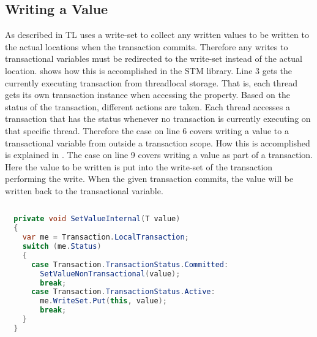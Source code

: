 \subsection{Writing a Value}
\label{sec:stm_imple_internal_detials_write}
As described in  TL uses a write-set to collect any written values to be written to the actual locations when the transaction commits. Therefore any writes to transactional variables must be redirected to the write-set instead of the actual location.  shows how this is accomplished in the \ac{STM} library. Line 3 gets the currently executing transaction from threadlocal storage. That is, each thread gets its own transaction instance when accessing the  property. Based on the status of the transaction, different actions are taken. Each thread accesses a transaction that has the status  whenever no transaction is currently executing on that specific thread. Therefore the case on line 6 covers writing a value to a transactional variable from outside a transaction scope. How this is accomplished is explained in . The case on line 9 covers writing a value as part of a transaction. Here the value to be written is put into the write-set of the transaction performing the write. When the given transaction commits, the value will be written back to the transactional variable.

\begin{lstlisting}[float,label=lst:library_write_value,
  caption={Writing to a Transactional Variable},
  language=Java,  
  showspaces=false,
  showtabs=false,
  breaklines=true,
  showstringspaces=false,
  breakatwhitespace=true,
  commentstyle=\color{greencomments},
  keywordstyle=\color{bluekeywords},
  stringstyle=\color{redstrings},
  morekeywords={atomic, retry, orElse, var, get, set}]  % Start your code-block
  
  private void SetValueInternal(T value)
  {
    var me = Transaction.LocalTransaction;
    switch (me.Status)
    {
      case Transaction.TransactionStatus.Committed:
        SetValueNonTransactional(value);
        break;
      case Transaction.TransactionStatus.Active:
        me.WriteSet.Put(this, value);
        break;
    }
  }
\end{lstlisting}

